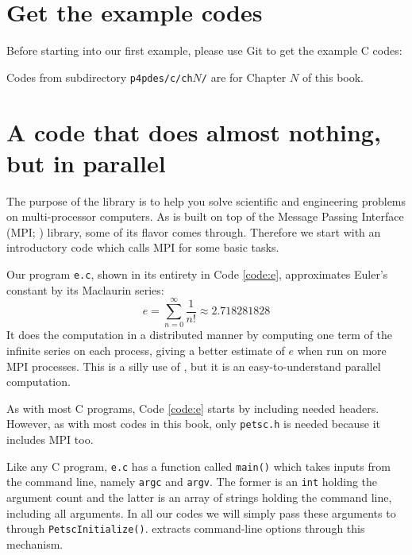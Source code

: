 
\section{Get the example codes}

Before starting into our first example, please use Git to get the example C codes:
Codes from subdirectory \texttt{p4pdes/c/ch}$N$\texttt{/} are for Chapter $N$ of this book.

\section{A code that does almost nothing, but in parallel}

The purpose of the \PETSc library is to help you solve scientific and engineering problems on multi-processor computers.  As \PETSc is built on top of the Message Passing Interface (MPI; \citep{Groppetal1999}) library, some of its flavor comes through.  Therefore we start with an introductory \PETSc code which calls MPI for some basic tasks.

Our program \texttt{e.c}, shown in its entirety in Code \ref{code:e}, approximates Euler's constant by its Maclaurin series:
\begin{equation}
e = \sum_{n = 0}^\infty \frac{1}{n!} \approx 2.718281828 \label{eq:gs:introseries}
\end{equation}
It does the computation in a distributed manner by computing one term of the infinite series on each process, giving a better estimate of $e$ when run on more MPI processes. This is a silly use of \PETSc, but it is an easy-to-understand parallel computation.

As with most C programs, Code \ref{code:e} starts by including needed headers.  However, as with most codes in this book, only \texttt{petsc.h} is needed because it includes MPI too.

Like any C program, \texttt{e.c} has a function called \texttt{main()} which takes inputs from the command line, namely \texttt{argc} and \texttt{argv}.  The former is an \texttt{int} holding the argument count and the latter is an array of strings holding the command line, including all arguments.  In all our codes we will simply pass these arguments to \PETSc through \texttt{PetscInitialize()}.  \PETSc extracts command-line options through this mechanism.

